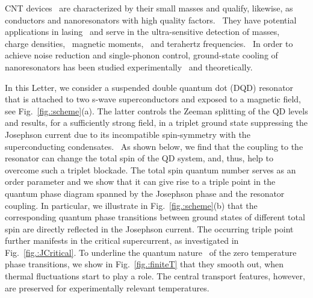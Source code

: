 \documentclass[aps,prb,twocolumn,superscriptaddress,amsmath,amssymb,longbibliography]{revtex4-1}
\begin{document}
	CNT devices~\cite{SchindelePRL2012a,JungNanoL2013a,WenNP2019a,UrgellNP2019a,LotfizadehPRL2019a,KarkiPRB2019a} are characterized by their small masses and qualify, likewise, as conductors and nanoresonators 
	with high quality factors.~\cite{HuettelNanoL2009a,GanzhornPRL2012a,MoserNatureN2014a} They have potential applications 
	in lasing~\cite{LiOExpress2012a, LiuOMExpress2015a, MantovaniPRB2019a,RastelliPRB2019a} and serve in the ultra-sensitive detection of masses,~\cite{NaikNatureN2009a,ChasteNatureN2012a}
	charge densities,~\cite{ShapirScience2019a}
	magnetic moments,~\cite{CleuziouNatureN2006a,UrdampilletaNatureM2011a,PeiNatureN2012a} and terahertz frequencies.~\cite{RinzanNanoL2012a} In order to achieve noise reduction and single-phonon control, ground-state cooling of nanoresonators has been studied experimentally~\cite{OConnellNature2010a,ClarkNature2017a} 
	and theoretically.~\cite{StadlerPRL2014a,StadlerPRL2016a,MantovaniPRResearch2019a}
	
	In this Letter, we consider a suspended double quantum dot (DQD) resonator that is attached to two s-wave superconductors and exposed to a 
	magnetic field, see Fig.~\ref{fig.:scheme}(a). The latter controls the Zeeman splitting of the QD levels and results, for a sufficiently strong field, in
	a triplet ground state suppressing the Josephson current due to its incompatible spin-symmetry with the superconducting condensates.~\cite{EldridgePRB2010a}
	As shown below, we find that the coupling to the resonator can change the total spin of the QD system, and, thus, help to overcome 
	such a triplet blockade. The total spin quantum number serves as an order parameter and we show that it can give rise to a 
	triple point in the quantum phase diagram spanned by the Josephson phase and the resonator coupling. In particular, we illustrate in 
	Fig.~\ref{fig.:scheme}(b) that the corresponding quantum phase transitions between ground states of different total spin are directly reflected 
	in the Josephson current. The occurring triple point further manifests in the critical supercurrent, as investigated in Fig.~\ref{fig.:JCritical}. 
	To underline the quantum nature~\cite{VojtaRPP2003a, PeanoNewJP2014a} of the zero temperature phase transitions, we show in Fig.~\ref{fig.:finiteT} 
	that they smooth out, when thermal fluctuations start to play a role. The central transport features, however, are preserved for experimentally relevant temperatures.
	
	
\end{document}
